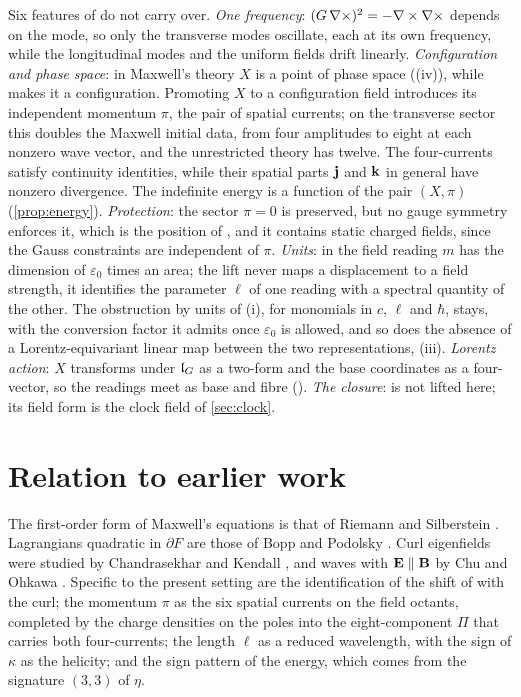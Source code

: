 Six features of  do not carry over. \emph{One frequency}: $(G\,\nabla\times)^2=-\nabla\times\nabla\times$ depends on the mode, so only the
transverse modes oscillate, each at its own frequency, while the longitudinal modes and the uniform fields drift linearly.
\emph{Configuration and phase space}: in Maxwell's theory $X$ is a point of phase space ((iv)), while  makes it a
configuration. Promoting $X$ to a configuration field introduces its independent momentum $\pi$, the pair of spatial currents; on the
transverse sector this doubles the Maxwell initial data, from four amplitudes to eight at each nonzero wave vector, and the unrestricted
theory has twelve. The four-currents satisfy continuity identities, while their spatial parts $\mathbf j$ and $\mathbf k$ in general have nonzero
divergence. The indefinite energy is a function of the pair $(X,\pi)$ (\cref{prop:energy}). \emph{Protection}: the sector $\pi=0$ is preserved, but no gauge symmetry enforces it, which is
the position of , and it contains static charged fields, since the Gauss constraints are independent of $\pi$.
\emph{Units}: in the field reading $m$ has the dimension of $\varepsilon_0$ times an area; the lift never maps a displacement to a field
strength, it identifies the parameter $\ell$ of one reading with a spectral quantity of the other. The obstruction by units of
(i), for monomials in $c$, $\ell$ and $\hbar$, stays, with the conversion factor it admits once $\varepsilon_0$ is allowed, and so
does the absence of a Lorentz-equivariant linear map between the two representations, (iii). \emph{Lorentz action}: $X$ transforms under $\mathfrak l_G$ as a two-form and the base coordinates as a
four-vector, so the readings meet as base and fibre (). \emph{The closure}:  is not lifted here; its field
form is the clock field of \cref{sec:clock}.

\section{Relation to earlier work}

The first-order form of Maxwell's equations is that of Riemann and Silberstein \cite{Silberstein1907,BialynickiBirula13}. Lagrangians
quadratic in $\partial F$ are those of Bopp and Podolsky \cite{Bopp40,Podolsky42}. Curl eigenfields were studied by Chandrasekhar and
Kendall \cite{ChandrasekharKendall57}, and waves with $\mathbf E\parallel\mathbf B$ by Chu and Ohkawa \cite{ChuOhkawa82}. Specific to the present
setting are the identification of the shift of  with the curl; the momentum $\pi$ as the six spatial currents on the field
octants, completed by the charge densities on the poles into the eight-component $\Pi$ that carries both four-currents; the length $\ell$
as a reduced wavelength, with the sign of $\kappa$ as the helicity; and the sign pattern of the energy, which comes from the signature $(3,3)$ of
$\eta$.
